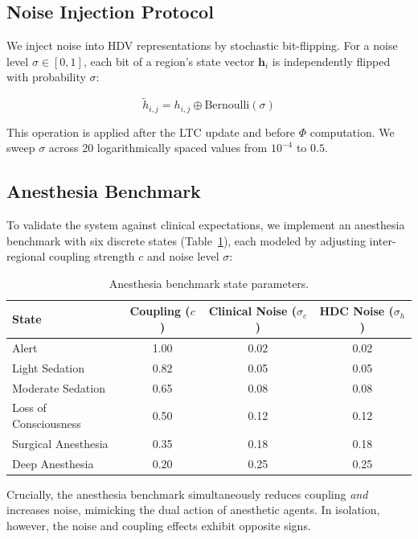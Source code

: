 \documentclass[12pt,a4paper]{article}
\begin{document}
\subsection{Noise Injection Protocol}

We inject noise into HDV representations by stochastic bit-flipping. For a noise level $\sigma \in [0, 1]$, each bit of a region's state vector $\mathbf{h}_i$ is independently flipped with probability $\sigma$:

\begin{equation}
\tilde{h}_{i,j} = h_{i,j} \oplus \text{Bernoulli}(\sigma)
\end{equation}

This operation is applied after the LTC update and before $\Phi$ computation. We sweep $\sigma$ across 20 logarithmically spaced values from $10^{-4}$ to $0.5$.

\subsection{Anesthesia Benchmark}

To validate the system against clinical expectations, we implement an anesthesia benchmark with six discrete states (Table~\ref{tab:anesthesia-params}), each modeled by adjusting inter-regional coupling strength $c$ and noise level $\sigma$:

\begin{table}[H]
\centering
\caption{Anesthesia benchmark state parameters.}
\label{tab:anesthesia-params}
\begin{tabular}{lccc}
\toprule
\textbf{State} & \textbf{Coupling ($c$)} & \textbf{Clinical Noise ($\sigma_c$)} & \textbf{HDC Noise ($\sigma_h$)} \\
\midrule
Alert & 1.00 & 0.02 & 0.02 \\
Light Sedation & 0.82 & 0.05 & 0.05 \\
Moderate Sedation & 0.65 & 0.08 & 0.08 \\
Loss of Consciousness & 0.50 & 0.12 & 0.12 \\
Surgical Anesthesia & 0.35 & 0.18 & 0.18 \\
Deep Anesthesia & 0.20 & 0.25 & 0.25 \\
\bottomrule
\end{tabular}
\end{table}

Crucially, the anesthesia benchmark simultaneously reduces coupling \emph{and} increases noise, mimicking the dual action of anesthetic agents. In isolation, however, the noise and coupling effects exhibit opposite signs.
\end{document}

